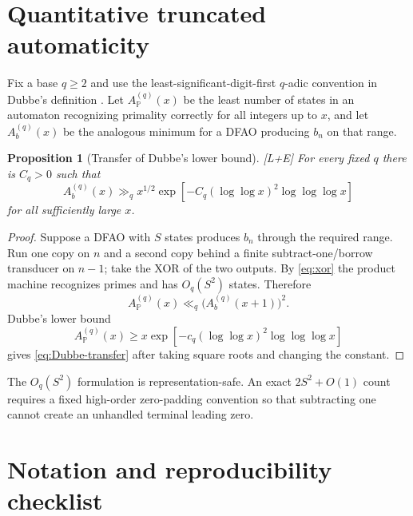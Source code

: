 \documentclass[11pt]{article}
\newtheorem{proposition}[theorem]{Proposition}
\theoremstyle{definition}
\theoremstyle{remark}
\newcommand{\PP}{\mathbb P}
\newcommand{\status}[1]{\textnormal{\textcolor{accent}{\footnotesize[#1]}}}
\begin{document}
\appendix

\section{Quantitative truncated automaticity}

Fix a base $q\ge2$ and use the least-significant-digit-first $q$-adic convention in
Dubbe's definition \cite{Dubbe}.  Let $A_{\PP}^{(q)}(x)$ be the least number of states in
an automaton recognizing primality correctly for all integers up to $x$, and let
$A_b^{(q)}(x)$ be the analogous minimum for a DFAO producing $b_n$ on that range.

\begin{proposition}[Transfer of Dubbe's lower bound]\label{prop:Dubbe-transfer}
\status{L+E}
For every fixed $q$ there is $C_q>0$ such that
\begin{equation}\label{eq:Dubbe-transfer}
 A_b^{(q)}(x)
 \gg_q x^{1/2}
 \exp\!\left[-C_q(\log\log x)^2\log\log\log x\right]
\end{equation}
for all sufficiently large $x$.
\end{proposition}

\begin{proof}
Suppose a DFAO with $S$ states produces $b_n$ through the required range.  Run one copy
on $n$ and a second copy behind a finite subtract-one/borrow transducer on $n-1$; take
the XOR of the two outputs.  By \eqref{eq:xor} the product machine recognizes primes and
has $O_q(S^2)$ states.  Therefore
\[
 A_{\PP}^{(q)}(x)\ll_q\bigl(A_b^{(q)}(x+1)\bigr)^2.
\]
Dubbe's lower bound
\[
 A_{\PP}^{(q)}(x)
 \ge x\exp\!\left[-c_q(\log\log x)^2\log\log\log x\right]
\]
gives \eqref{eq:Dubbe-transfer} after taking square roots and changing the constant.
\end{proof}

The $O_q(S^2)$ formulation is representation-safe.  An exact $2S^2+O(1)$ count
requires a fixed high-order zero-padding convention so that subtracting one cannot create
an unhandled terminal leading zero.

\section{Notation and reproducibility checklist}
\end{document}
